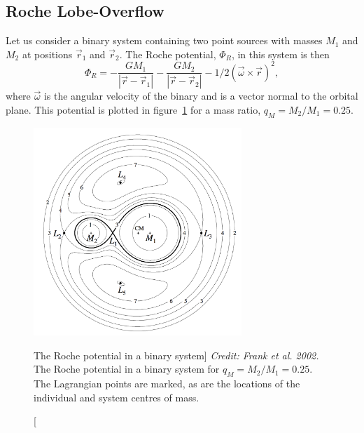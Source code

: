 \subsection{Roche Lobe-Overflow}
\label{sec:rlof}

Let us consider a binary system containing two point sources
with masses $M_1$ and $M_2$ at positions
$\vec{r}_1$ and $\vec{r}_2$. The Roche potential, $\Phi_R$, in this system 
is then
\begin{equation}
\Phi_R = - \frac{GM_1}{| \vec{r} - \vec{r}_1 |} - 
\frac{GM_2}{| \vec{r} - \vec{r}_2 |} - 1/2 (\vec{\omega} \times
 \vec{r})^2,
\label{eq:roche}
\end{equation} 
where $\vec{\omega}$ is the angular velocity of the binary and is a vector normal to
the orbital plane. This potential is plotted in figure~\ref{fig:roche} for a mass ratio, 
$q_M = M_2 / M_1 = 0.25$.

\begin{figure}
\centering
\includegraphics[width=0.7\textwidth]{figures/01-intro/roche_potential.png}
\caption
[The Roche potential in a binary system]
{
{\sl Credit: Frank et al. 2002.} 
The Roche potential in a binary system for $q_M = M_2 / M_1 = 0.25$.
The Lagrangian points are marked, as are the locations of the individual
and system centres of mass.
} 
\label{fig:roche}
\end{figure}

